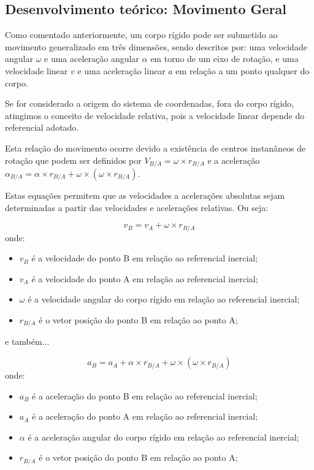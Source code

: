 \subsection{Desenvolvimento teórico: Movimento Geral}
\label{sec:desenvolvimento}

Como comentado anteriormente, um corpo rígido pode ser submetido ao movimento generalizado em três dimensões, sendo descritos por:
uma velocidade angular \(\omega\) e uma aceleração angular \(\alpha\) em torno de um eixo de rotação, e uma velocidade linear \(v\) e uma aceleração linear \(a\) em relação a um ponto qualquer do corpo.

Se for considerado a origem do sistema de coordenadas, fora do corpo rígido, atingimos o conceito de velocidade relativa, pois a velocidade linear depende do referencial adotado.

Esta relação do movimento ocorre devido a existência de centros instanâneos de rotação que podem ser definidos por \(V_{B/A} = \omega \times r_{B/A}\) e a aceleração \(\alpha_{B/A} = \alpha \times r_{B/A} + \omega \times \left( \omega \times r_{B/A} \right)\).

Estas equações permitem que as velocidades a acelerações absolutas sejam determinadas a partir das velocidades e acelerações relativas. Ou seja:

\begin{equation}
    v_B = v_A + \omega \times r_{B/A}
\end{equation}
onde:
\begin{itemize}
    \item \(v_B\) é a velocidade do ponto B em relação ao referencial inercial;
    \item \(v_A\) é a velocidade do ponto A em relação ao referencial inercial;
    \item \(\omega\) é a velocidade angular do corpo rígido em relação ao referencial inercial;
    \item \(r_{B/A}\) é o vetor posição do ponto B em relação ao ponto A;
\end{itemize}

e também...

\begin{equation}
    a_B = a_A + \alpha \times r_{B/A} + \omega \times \left( \omega \times r_{B/A} \right)
\end{equation}
onde:
\begin{itemize}
    \item \(a_B\) é a aceleração do ponto B em relação ao referencial inercial;
    \item \(a_A\) é a aceleração do ponto A em relação ao referencial inercial;
    \item \(\alpha\) é a aceleração angular do corpo rígido em relação ao referencial inercial;
    \item \(r_{B/A}\) é o vetor posição do ponto B em relação ao ponto A;

\end{itemize}

